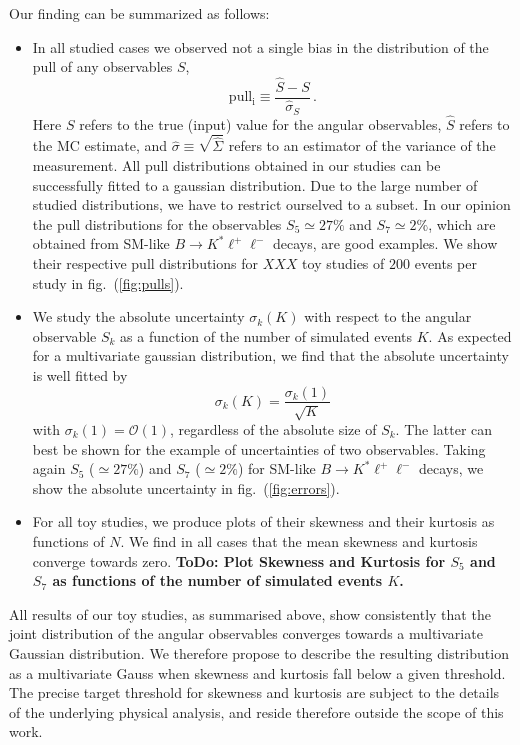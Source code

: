 \documentclass[aps,prd,reprint,nofootinbib,preprintnumbers]{revtex4}
\newcommand{\est}[1]{\widehat{#1}}
\newcommand{\order}[1]{\mathcal{O}\left({#1}\right)}
\newcommand{\reffig}[1]{fig.~(\ref{fig:#1})}
\newcommand{\todo}[1]{{\color{red}\bf ToDo: #1}}
\newcommand{\danny}[1]{{\color{purple}#1}}
\begin{document}
Our finding can be summarized as follows:
\begin{itemize}
    \item In all studied cases we observed not a single bias in the distribution of the $\mathrm{pull}$
        of any observables $S$,
        \begin{equation}
            \mathrm{pull_i} \equiv \frac{\est{S} - S}{\est{\sigma}_S}\,.
        \end{equation}
        Here $S$ refers to the true (input) value for the angular observables, $\est{S}$ refers to the
        MC estimate, and $\est{\sigma} \equiv \sqrt{\est{\Sigma}}$ refers to an estimator of the
        variance of the measurement. All pull distributions obtained in our studies can be successfully
        fitted to a gaussian distribution. Due to the large number of studied distributions, we have
        to restrict ourselved to a subset. In our opinion the pull distributions for the observables
        $S_5 \simeq 27\%$ and $S_7 \simeq 2\%$, which are obtained from SM-like $B\to K^*\ell^+\ell^-$
        decays, are good examples. We show their respective pull distributions for \danny{$XXX$} toy studies
        of $200$ events per study in \reffig{pulls}.
    \item We study the absolute uncertainty $\sigma_k(K)$ with respect to the angular observable $S_k$
        as a function of the number of simulated events $K$. As expected for a multivariate gaussian
        distribution, we find that the absolute uncertainty is well fitted by
        \begin{equation}
            \label{eq:unc-on-mean}
            \sigma_k(K) = \frac{\sigma_k(1)}{\sqrt{K}}
        \end{equation}
        with $\sigma_k(1) = \order{1}$, regardless of the absolute size of $S_k$. The latter can best be shown
        for the example of uncertainties of two observables. Taking again $S_5$ ($\simeq 27\%$) and $S_7$ ($\simeq 2\%$)
        for SM-like $B\to K^*\ell^+\ell^-$ decays, we show the absolute uncertainty in \reffig{errors}.
    \item For all toy studies, we produce plots of their skewness and their kurtosis as functions of
        $N$. We find in all cases that the mean skewness and kurtosis converge towards zero.
        \todo{Plot Skewness and Kurtosis for $S_5$ and $S_7$ as functions of the number of simulated events $K$.}
\end{itemize}
All results of our toy studies, as summarised above, show consistently that the joint distribution of the angular
observables converges towards a multivariate Gaussian distribution. We therefore propose to describe the
resulting distribution as a multivariate Gauss when skewness and kurtosis fall below a given threshold.
The precise target threshold for skewness and kurtosis are subject to the details of the underlying physical analysis, and reside therefore outside the scope of this work.
\end{document}

